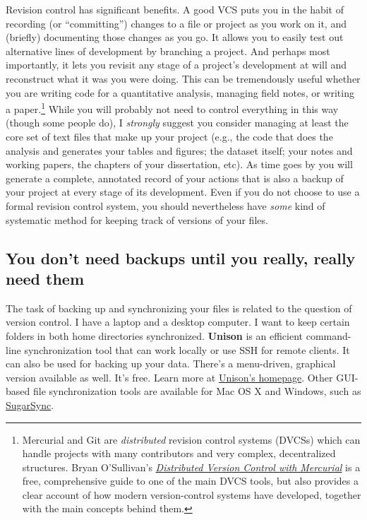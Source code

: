 \documentclass[11pt,article,oneside]{memoir}
\begin{document}
Revision control has significant benefits. A good VCS puts you in the habit of recording (or ``committing'') changes to a file or project as you work on it, and (briefly) documenting those changes as you go. It allows you to easily test out alternative lines of development by branching a project. And perhaps most importantly, it lets you revisit any stage of a project's development at will and reconstruct what it was you were doing. This can be tremendously useful whether you are writing code for a quantitative analysis, managing field notes, or writing a paper.\footnote{Mercurial and Git are \emph{distributed} revision control systems (DVCSs) which can handle projects with many contributors and very complex, decentralized structures. Bryan O'Sullivan's \href{http://hgbook.red-bean.com/hgbook.pdf}{\emph{Distributed Version Control with Mercurial}} is a free, comprehensive guide to one of the main DVCS tools, but also provides a clear account of how modern version-control systems have developed, together with the main concepts behind them.} While you will probably not need to control everything in this way (though some people do), I \emph{strongly} suggest you consider managing at least the core set of text files that make up your project (e.g., the code that does the analysis and generates your tables and figures; the dataset itself; your notes and working papers, the chapters of your dissertation, etc). As time goes by you will generate a complete, annotated  record of your actions that is also a backup of your project at every stage of its development. Even if you do not choose to use a formal revision control system, you should nevertheless have \emph{some} kind of systematic method for keeping track of versions of your files. 

\subsection{You don't need backups until you really, really need them}
The task of backing up and synchronizing your files is related to the question of version control. I have a laptop and a desktop computer. I want to keep certain folders in both home directories synchronized. \textbf{Unison} is an efficient command-line synchronization tool that can work locally or use SSH for remote clients. It can also be used for backing up your data. There's a menu-driven, graphical version available as well. It's free. Learn more at \href{http://www.cis.upenn.edu/~bcpierce/unison/}{Unison's homepage}. Other GUI-based file synchronization tools are available for Mac OS X and Windows, such as \href{http://www.sugarsync.com/}{SugarSync}. 
\end{document}
